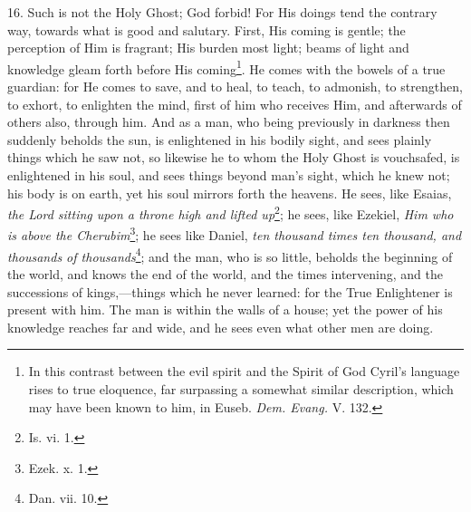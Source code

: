 16. Such is not the Holy Ghost; God forbid! For His doings tend the contrary way, towards what is good and salutary. First, His coming is gentle; the perception of Him is fragrant; His burden most light; beams of light and knowledge gleam forth before His coming\footnote{In this contrast between the evil spirit and the Spirit of God Cyril’s language rises to true eloquence, far surpassing a somewhat similar description, which may have been known to him, in Euseb. \emph{Dem. Evang.} V. 132.}. He comes with the bowels of a true guardian: for He comes to save, and to heal, to teach, to admonish, to strengthen, to exhort, to enlighten the mind, first of him who receives Him, and afterwards of others also, through him. And as a man, who being previously in darkness then suddenly beholds the sun, is enlightened in his bodily sight, and sees plainly things which he saw not, so likewise he to whom the Holy Ghost is vouchsafed, is enlightened in his soul, and sees things beyond man’s sight, which he knew not; his body is on earth, yet his soul mirrors forth the heavens. He sees, like Esaias, \emph{the Lord sitting upon a throne high and lifted up}\footnote{Is. vi. 1.}; he sees, like Ezekiel, \emph{Him who is above the Cherubim}\footnote{Ezek. x. 1.}; he sees like Daniel, \emph{ten thousand times ten thousand, and thousands of thousands}\footnote{Dan. vii. 10.}; and the man, who is so little, beholds the beginning of the world, and knows the end of the world, and the times intervening, and the successions of kings,—things which he never learned: for the True Enlightener is present with him. The man is within the walls of a house; yet the power of his knowledge reaches far and wide, and he sees even what other men are doing.

